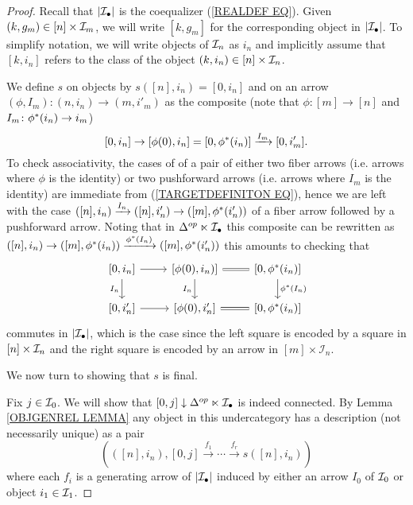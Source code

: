 \documentclass[a4paper,10pt]{article}%
\begin{document}
\begin{proof}
Recall that $|\mathcal{I}_{\bullet}|$ is the coequalizer (\ref{REALDEF EQ}). Given $(k,g_m) \in [n] \times \mathcal{I}_m$, we will write 
$[k,g_m]$ for the corresponding object in $|\mathcal{I}_{\bullet}|$.
To simplify notation, we will write objects of $\mathcal{I}_n$ as $i_n$
and implicitly assume that $[k,i_n]$ refers to the class of the object $(k,i_n) \in [n] \times \mathcal{I}_n$.


We define $s$ on objects by 
$s([n],i_n)=[0,i_n]$ and on an arrow 
$(\phi,I_m)\colon (n,i_n) \to (m,i'_m)$ as the composite
(note that $\phi\colon [m] \to [n]$ and $I_m\colon \phi^{\**}(i_n)\to i_m$)
\begin{equation}\label{TARGETDEFINITON EQ}
	[0,i_n] \to [\phi(0),i_n] =
	[0,\phi^{\**}(i_n)]	
	 \xrightarrow{I_m} 
	[0,i'_m].
\end{equation}
To check associativity, the cases of of a pair of either two fiber arrows (i.e. arrows where $\phi$ is the identity) or two pushforward arrows (i.e. arrows where $I_m$ is the identity) are immediate from (\ref{TARGETDEFINITON EQ}), 
hence we are left with the case 
$([n],i_n) \xrightarrow{I_n} ([n],i'_n) \to 
([m],\phi^{\**}(i'_n))$
 of a fiber arrow followed by a pushforward arrow. 
 Noting that in $\Delta^{op} \ltimes \mathcal{I}_{\bullet}$
this composite can be rewritten as
$([n],i_n) \to ([m],\phi^{\**}(i_n))
\xrightarrow{\phi^{\**}(I_n)} 
([m],\phi^{\**}(i'_n))$
 this amounts to checking that
\begin{equation}
\begin{tikzcd}
\left[0,i_n\right] \ar{r} \ar{d}[swap]{I_n} &
\left[\phi(0),i_n) \right] \ar[equal]{r} \ar{d}[swap]{I_n} &
\left[0,\phi^{\**}(i_n) \right] \ar{d}{\phi^{\**}(I_n)}
	\\
\left[0,i'_n\right] \ar{r} &
\left[\phi(0),i'_n\right] \ar[equal]{r} &
\left[0,\phi^{\**}(i_n)\right]
\end{tikzcd}
\end{equation}
commutes in $|\mathcal{I}_{\bullet}|$,
which is the case since the left square is encoded by a square in $[n]\times \mathcal{I}_n$
and the right square is encoded by an arrow in $[m]\times \mathcal{I}_n$.

We now turn to showing that $s$ is final.

Fix $j \in \mathcal{I}_0$. We will show that 
$[0,j] \downarrow \Delta^{op} \ltimes \mathcal{I}_{\bullet}$ is indeed connected.
By Lemma \ref{OBJGENREL LEMMA} any object 
 in this undercategory has a description (not necessarily unique) as a pair
\[\left(\left([n],i_n\right), [0,j] \xrightarrow{f_1} \cdots \xrightarrow{f_r} s([n],i_n) \right)\]
where each $f_i$ is a generating arrow of $|\mathcal{I}_{\bullet}|$
induced by either an arrow $I_0$ of $\mathcal{I}_0$ or object $i_1\in \mathcal{I}_1$.


\end{proof}
\end{document}
